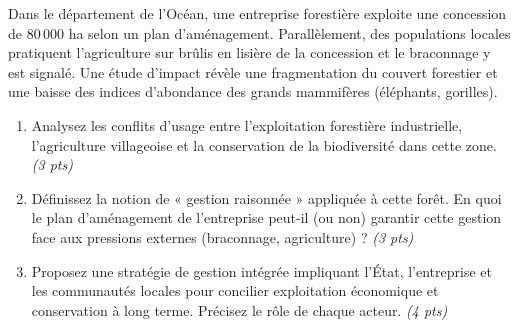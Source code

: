 \documentclass[11pt]{article}
\begin{document}
\begin{exercice}
\label{exo:foret_sud}
Dans le département de l'Océan, une entreprise forestière exploite une concession de 80\,000 ha selon un plan d'aménagement. Parallèlement, des populations locales pratiquent l'agriculture sur brûlis en lisière de la concession et le braconnage y est signalé. Une étude d'impact révèle une fragmentation du couvert forestier et une baisse des indices d'abondance des grands mammifères (éléphants, gorilles).

\begin{enumerate}
    \item Analysez les conflits d'usage entre l'exploitation forestière industrielle, l'agriculture villageoise et la conservation de la biodiversité dans cette zone. \textit{(3 pts)}
    \item Définissez la notion de « gestion raisonnée » appliquée à cette forêt. En quoi le plan d'aménagement de l'entreprise peut-il (ou non) garantir cette gestion face aux pressions externes (braconnage, agriculture) ? \textit{(3 pts)}
    \item Proposez une stratégie de gestion intégrée impliquant l'État, l'entreprise et les communautés locales pour concilier exploitation économique et conservation à long terme. Précisez le rôle de chaque acteur. \textit{(4 pts)}
\end{enumerate}
\end{exercice}
\end{document}
